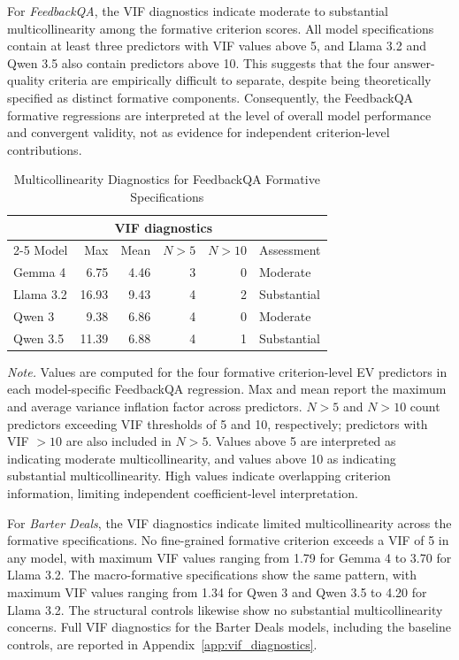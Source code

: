For \textit{FeedbackQA}, the VIF diagnostics indicate moderate to substantial multicollinearity among the formative criterion scores. All model specifications contain at least three predictors with VIF values above 5, and Llama 3.2 and Qwen 3.5 also contain predictors above 10. This suggests that the four answer-quality criteria are empirically difficult to separate, despite being theoretically specified as distinct formative components. Consequently, the FeedbackQA formative regressions are interpreted at the level of overall model performance and convergent validity, not as evidence for independent criterion-level contributions.



\begin{table}
    \centering
    \caption{Multicollinearity Diagnostics for FeedbackQA Formative Specifications}
    \label{tab:VIF_feedbackqa}
    \begin{tabular}{lrrrrl}
    \toprule
    & \multicolumn{4}{c}{VIF diagnostics} & \\
    \cmidrule(lr){2-5}
    Model & Max & Mean & $N > 5$ & $N > 10$ & Assessment \\
    \midrule
    Gemma 4   & 6.75  & 4.46 & 3 & 0 & Moderate \\
    Llama 3.2 & 16.93 & 9.43 & 4 & 2 & Substantial \\
    Qwen 3    & 9.38  & 6.86 & 4 & 0 & Moderate \\
    Qwen 3.5  & 11.39 & 6.88 & 4 & 1 & Substantial \\
    \bottomrule
    \end{tabular}

    \begin{flushleft}
    \footnotesize
    \textit{Note.} Values are computed for the four formative criterion-level EV predictors in each model-specific FeedbackQA regression. Max and mean report the maximum and average variance inflation factor across predictors. $N > 5$ and $N > 10$ count predictors exceeding VIF thresholds of 5 and 10, respectively; predictors with VIF $>10$ are also included in $N>5$. Values above 5 are interpreted as indicating moderate multicollinearity, and values above 10 as indicating substantial multicollinearity. High values indicate overlapping criterion information, limiting independent coefficient-level interpretation.
    \end{flushleft}
\end{table}




For \textit{Barter Deals}, the VIF diagnostics indicate limited multicollinearity across the formative specifications. No fine-grained formative criterion exceeds a VIF of 5 in any model, with maximum VIF values ranging from 1.79 for Gemma 4 to 3.70 for Llama 3.2. The macro-formative specifications show the same pattern, with maximum VIF values ranging from 1.34 for Qwen 3 and Qwen 3.5 to 4.20 for Llama 3.2. The structural controls likewise show no substantial multicollinearity concerns. Full VIF diagnostics for the Barter Deals models, including the baseline controls, are reported in Appendix~\ref{app:vif_diagnostics}.

